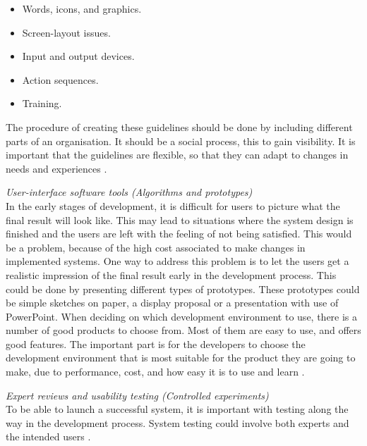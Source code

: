 \begin{itemize}
\renewcommand{\labelitemi}{$\bullet$}
\item Words, icons, and graphics.
\item Screen-layout issues.
\item Input and output devices.
\item Action sequences.
\item Training.
\end{itemize}

The procedure of creating these guidelines should be done by including different parts of an organisation. It should be a social process, this to gain visibility. It is important that the guidelines are flexible, so that they can adapt to changes in needs and experiences \cite{mmi}. 


\emph{User-interface software tools (Algorithms and prototypes)}\\
In the early stages of development, it is difficult for users to picture what the final result will look like. This may lead to situations where the system design is finished and the users are left with the feeling of not being satisfied. This would be a problem, because of the high cost associated to make changes in implemented systems. One way to address this problem is to let the users get a realistic impression of the final result early in the development process. This could be done by presenting different types of prototypes. These prototypes could be simple sketches on paper, a display proposal or a presentation with use of PowerPoint. 
When deciding on which development environment to use, there is a number of good products to choose from. Most of them are easy to use, and offers good features. The important part is for the developers to choose the development environment that is most suitable for the product they are going to make, due to performance, cost, and how easy it is to use and learn \cite{mmi}.
	

\emph{Expert reviews and usability testing (Controlled experiments)}\\
To be able to launch a successful system, it is important with testing along the way in the development process. System testing could involve both experts and the intended users \cite{mmi}.  